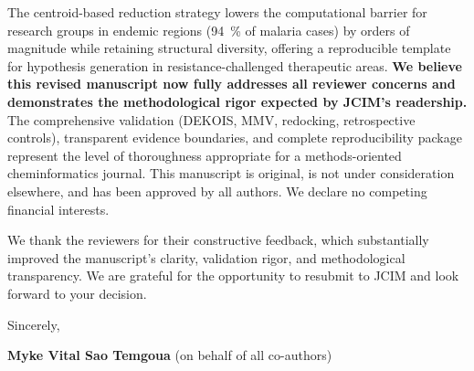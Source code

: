 \documentclass[9pt,letterpaper]{article}
\begin{document}
The centroid-based reduction strategy lowers the computational barrier for research groups in endemic regions (\qty{94}{\percent} of malaria cases) by orders of magnitude while retaining structural diversity, offering a reproducible template for hypothesis generation in resistance-challenged therapeutic areas. \textbf{We believe this revised manuscript now fully addresses all reviewer concerns and demonstrates the methodological rigor expected by JCIM's readership.} The comprehensive validation (DEKOIS, MMV, redocking, retrospective controls), transparent evidence boundaries, and complete reproducibility package represent the level of thoroughness appropriate for a methods-oriented cheminformatics journal. This manuscript is original, is not under consideration elsewhere, and has been approved by all authors. We declare no competing financial interests.

We thank the reviewers for their constructive feedback, which substantially improved the manuscript's clarity, validation rigor, and methodological transparency. We are grateful for the opportunity to resubmit to JCIM and look forward to your decision.

\vspace{0.3em}

\noindent Sincerely,

\noindent \textbf{Myke Vital Sao Temgoua} (on behalf of all co-authors)
\end{document}
